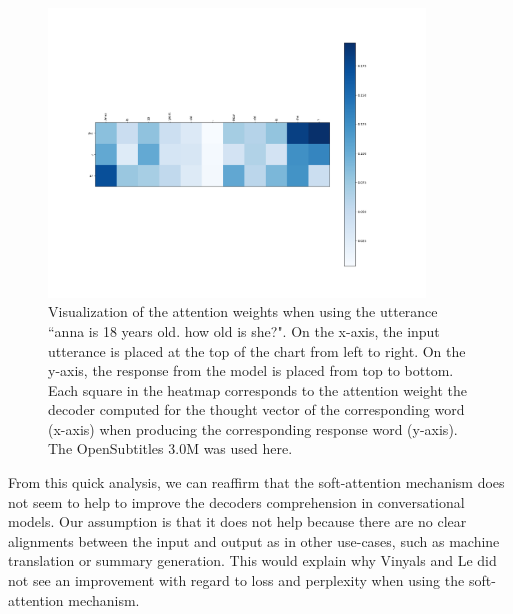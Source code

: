 \begin{figure}[h]
	\centering
	\includegraphics[width=10cm]{img/attention/attention_visualization3_OpenSubtitle-3M.png}
	\caption{Visualization of the attention weights when using the utterance ``anna is 18 years old. how old is she?". On the x-axis, the input utterance is placed at the top of the chart from left to right. On the y-axis, the response from the model is placed from top to bottom. Each square in the heatmap corresponds to the attention weight the decoder computed for the thought vector of the corresponding word (x-axis) when producing the corresponding response word (y-axis). The OpenSubtitles 3.0M was used here.}
	\label{results:attention:example3:opensubtitles-3M}
\end{figure}

From this quick analysis, we can reaffirm that the soft-attention mechanism does not seem to help to improve the decoders comprehension in conversational models. Our assumption is that it does not help because there are no clear alignments between the input and output as in other use-cases, such as machine translation or summary generation. This would explain why Vinyals and Le did not see an improvement with regard to loss and perplexity when using the soft-attention mechanism.

